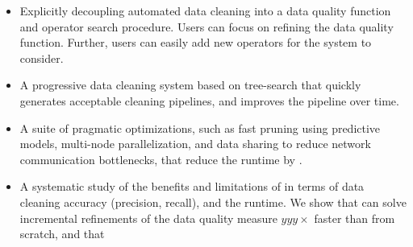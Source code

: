 \begin{itemize}[leftmargin=*, topsep=0mm, itemsep=0mm]
  \item Explicitly decoupling automated data cleaning into a data quality function and operator search procedure.  Users can focus on refining the data quality function.  Further, users can easily add new operators for the system to consider.
  \item A progressive data cleaning system based on tree-search that quickly generates acceptable cleaning pipelines, and improves the pipeline over time.   
  \item A suite of pragmatic optimizations, such as fast pruning using predictive models, multi-node parallelization, and data sharing to reduce network communication bottlenecks, that reduce the runtime by .
  \item A systematic study of the benefits and limitations of \sys in terms of data cleaning accuracy (precision, recall), and the runtime.  We show that \sys can solve incremental refinements of the data quality measure $yyy\times$ faster than from scratch, and that 
\end{itemize}



